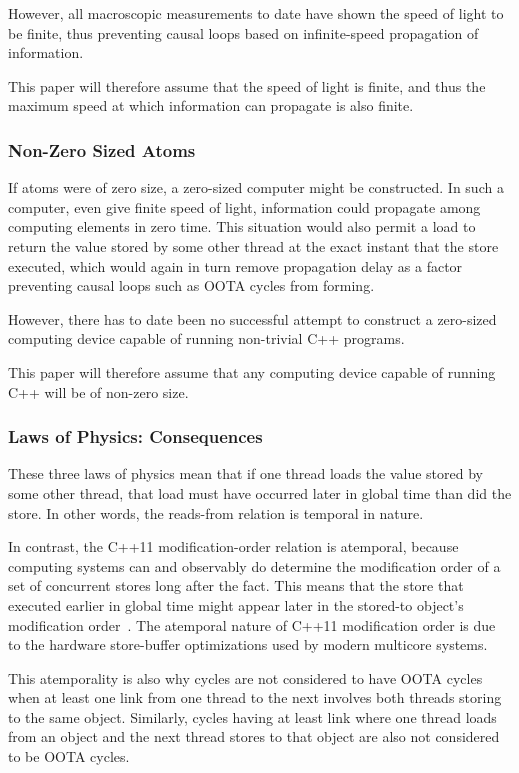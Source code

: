 \documentclass[10]{article}
\begin{document}
However, all macroscopic measurements to date have shown the speed of
light to be finite, thus preventing causal loops based on infinite-speed
propagation of information.

This paper will therefore assume that the speed of light is finite, and
thus the maximum speed at which information can propagate is also finite.

\subsubsection{Non-Zero Sized Atoms}
\label{sec:Non-Zero Sized Atoms}

If atoms were of zero size, a zero-sized computer might be constructed.
In such a computer, even give finite speed of light, information could
propagate among computing elements in zero time.
This situation would also permit a load to return the value stored by
some other thread at the exact instant that the store executed, which
would again in turn remove propagation delay as a factor preventing
causal loops such as OOTA cycles from forming.

However, there has to date been no successful attempt to construct a
zero-sized computing device capable of running non-trivial C++ programs.

This paper will therefore assume that any computing device capable of
running C++ will be of non-zero size.

\subsubsection{Laws of Physics: Consequences}
\label{sec:Laws of Physics: Consequences}

These three laws of physics mean that if one thread loads the value
stored by some other thread, that load must have occurred later
in global time than did the store.
In other words, the reads-from relation is temporal in nature.

In contrast, the C++11 modification-order relation is atemporal,
because computing systems can and observably do determine the
modification order of a set of concurrent stores long after the fact.
This means that the store that executed earlier in global time
might appear later in the stored-to object's modification
order~\cite{McKenney20xxParallelProgramming}.
The atemporal nature of C++11 modification order is due to the hardware
store-buffer optimizations used by modern multicore systems.

This atemporality is also why cycles are not considered to have
OOTA cycles when at least one link from one thread to the next
involves both threads storing to the same object.
Similarly, cycles having at least link where one thread loads from an
object and the next thread stores to that object are also not considered
to be OOTA cycles.
\end{document}
